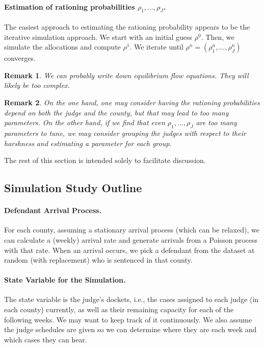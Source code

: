 \documentclass[11pt, oneside]{article}   	%
\theoremstyle{ModifiedStyle}
\newtheorem{remark}{Remark}
\begin{document}
\paragraph{Estimation of rationing probabilities $\rho_1,\ldots,\rho_J$.} The easiest approach to estimating the rationing probability appears to be the iterative simulation approach. We start with an initial guess $\rho^0$. Then, we simulate the allocations and compute $\rho^1$. We iterate until $\rho^n = (\rho_1^n,\ldots,\rho_J^n)$ converges.
\begin{remark}
	We can probably write down equilibrium flow equations. They will likely be too complex. 
\end{remark}
\begin{remark}
	On the one hand, one may consider having the rationing probabilities depend on both the judge and the county, but that may lead to too many parameters. On the other hand, if we find that even $\rho_1,\ldots,\rho_J$ are too many parameters to tune, we may consider grouping the judges with respect to their harshness and estimating a parameter for each group.
\end{remark}

The rest of this section is intended solely to facilitate discussion.
%
\subsection{Simulation Study Outline} 
%
\vspace{-1mm}
\paragraph{Defendant Arrival Process.} For each county, assuming a stationary arrival process (which can be relaxed), we can calculate a (weekly) arrival rate and generate arrivals from a Poisson process with that rate. When an arrival occurs, we pick a defendant from the dataset at random (with replacement) who is sentenced in that county.
%
\vspace{-3mm}
\paragraph{State Variable for the Simulation.} The state variable is the judge's dockets, i.e., the cases assigned to each judge (in each county) currently, as well as their remaining capacity for each of the following weeks. We may want to keep track of it continuously. We also assume the judge schedules are given so we can determine where they are each week and which cases they can hear.
\end{document}
